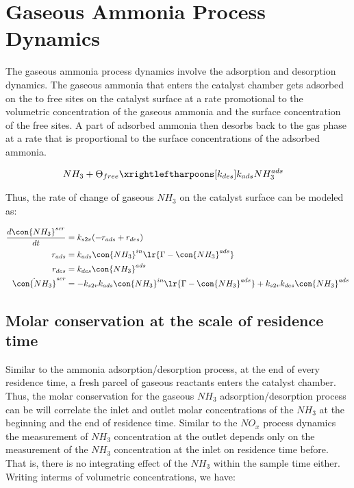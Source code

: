 \newpage
\section{Gaseous Ammonia Process Dynamics}
The gaseous ammonia process dynamics involve the adsorption and desorption
dynamics. The gaseous ammonia that enters the catalyst chamber gets adsorbed on
the to free sites on the catalyst surface at a rate promotional to the
volumetric concentration of the gaseous ammonia and the surface concentration
of the free sites. A part of adsorbed ammonia then desorbs back to the gas
phase at a rate that is proportional to the surface concentrations of the
adsorbed ammonia.

\begin{align*}
    NH_3 + \Theta_{free} &\xrightleftharpoons[k_{des}]{k_{ads}} NH_3^{ads}
\end{align*}

Thus, the rate of change of gaseous $NH_3$ on the catalyst surface can be modeled as:

\begin{align*}
    \frac{d \con{NH_3}^{scr}}{dt} &= k_{s2v} (-r_{ads} + r_{des}) \\
    r_{ads} &= k_{ads} \con{NH_3}^{in} \lr{\Gamma - \con{NH_3}^{ads}}\\
    r_{des} &= k_{des} \con{NH_3}^{ads}\\
    \dot{\con{NH_3}}^{scr} &= -k_{s2v}k_{ads} \con{NH_3}^{in} \lr{\Gamma - \con{NH_3}^{ads}} + k_{s2v} k_{des} \con{NH_3}^{ads}\\
\end{align*}


\subsection{Molar conservation at the scale of residence time}

Similar to the ammonia adsorption/desorption process, at the end of every
residence time, a fresh parcel of gaseous reactants enters the catalyst
chamber. Thus, the molar conservation for the gaseous $NH_3$
adsorption/desorption process can be will correlate the inlet and outlet molar
concentrations of the $NH_3$ at the beginning and the end of residence time.
Similar to the $NO_x$ process dynamics the measurement of $NH_3$ concentration
at the outlet depends only on the measurement of the $NH_3$ concentration at the
inlet on residence time before. That is, there is no integrating effect of the
$NH_3$ within the sample time either. Writing interms of volumetric concentrations, we have:

